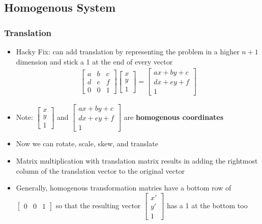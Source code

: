\documentclass[letterpaper,12pt]{article}
\begin{document}
\subsection{Homogenous System}

\subsubsection{Translation}
\begin{itemize}
 \item Hacky Fix: can add translation by representing the problem in a higher $n + 1$ dimension and stick a 1 at the end of every vector
       \begin{align}
        \begin{bmatrix}
         a & b & c \\
         d & e & f \\
         0 & 0 & 1
        \end{bmatrix}
        \begin{bmatrix}
         x \\
         y \\
         1
        \end{bmatrix}
        =\begin{bmatrix}
         ax + by + c \\
         dx + ey + f \\
         1
        \end{bmatrix}
       \end{align}
 \item Note: $\begin{bmatrix}
         x \\
         y \\
         1
        \end{bmatrix}$
       and
       $\begin{bmatrix}
         ax + by + c \\
         dx + ey + f \\
         1
        \end{bmatrix}$
       are \textbf{homogenous coordinates}
 \item Now we can rotate, scale, skew, and translate
 \item Matrix multiplication with translation matrix results in adding the rightmost column of the translation vector to the original vector
 \item Generally, homogenous transformation matries have a bottom row of $\begin{bmatrix}
         0 & 0 & 1
        \end{bmatrix}$ so that the resulting vector $\begin{bmatrix}
         x' \\
         y' \\
         1
        \end{bmatrix}$ has a 1 at the bottom too
\end{itemize}
\end{document}
